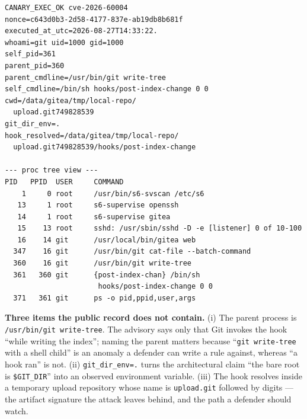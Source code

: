 \begin{lstlisting}[style=transcript,
caption={Process-level proof, read out of band from the target after the attack
(\texttt{evidence/canary-content.txt}, a 940-byte file; long lines are wrapped
here for column width). Top block: the hook reporting its own lineage --- the
executed nonce, \texttt{uid=1000(git)}, its own PID 361 and command line, and
parent 360. Bottom block: the container process tree captured \emph{by the hook
itself}, showing \texttt{s6-supervise gitea} $\rightarrow$ \texttt{gitea web}
$\rightarrow$ \texttt{git write-tree} $\rightarrow$ the hook shell. The
truncated \texttt{executed\_at\_utc} fraction is a busybox \texttt{date}
limitation documented in Section~\ref{sec:negative}; the proof is the nonce and
the lineage, not the timestamp.},
label={lst:canary}]
CANARY_EXEC_OK cve-2026-60004
nonce=c643d0b3-2d58-4177-837e-ab19db8b681f
executed_at_utc=2026-08-27T14:33:22.
whoami=git uid=1000 gid=1000
self_pid=361
parent_pid=360
parent_cmdline=/usr/bin/git write-tree
self_cmdline=/bin/sh hooks/post-index-change 0 0
cwd=/data/gitea/tmp/local-repo/
  upload.git749828539
git_dir_env=.
hook_resolved=/data/gitea/tmp/local-repo/
  upload.git749828539/hooks/post-index-change

--- proc tree view ---
PID   PPID  USER     COMMAND
    1     0 root     /usr/bin/s6-svscan /etc/s6
   13     1 root     s6-supervise openssh
   14     1 root     s6-supervise gitea
   15    13 root     sshd: /usr/sbin/sshd -D -e [listener] 0 of 10-100
   16    14 git      /usr/local/bin/gitea web
  347    16 git      /usr/bin/git cat-file --batch-command
  360    16 git      /usr/bin/git write-tree
  361   360 git      {post-index-chan} /bin/sh
                      hooks/post-index-change 0 0
  371   361 git      ps -o pid,ppid,user,args
\end{lstlisting}

\textbf{Three items the public record does not contain.} (i) The parent process
is \texttt{/usr/bin/git write-tree}. The advisory says only that Git invokes the
hook ``while writing the index''; naming the parent matters because
``\texttt{git write-tree} with a shell child'' is an anomaly a defender can write
a rule against, whereas ``a hook ran'' is not. (ii) \texttt{git\_dir\_env=.}
turns the architectural claim ``the bare root is \texttt{\$GIT\_DIR}'' into an
observed environment variable. (iii) The hook resolves inside a temporary upload
repository whose name is \texttt{upload.git} followed by digits --- the artifact
signature the attack leaves behind, and the path a defender should watch.

